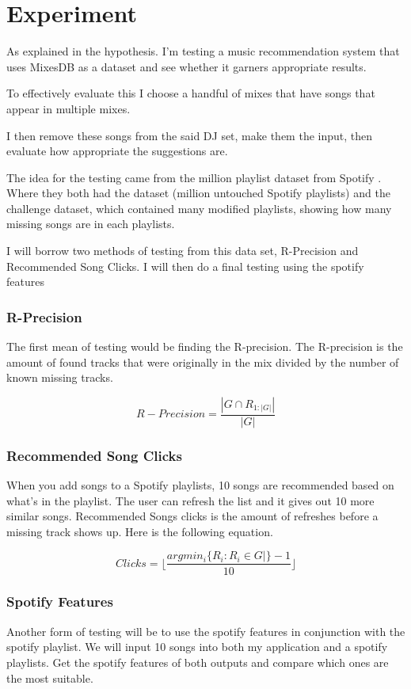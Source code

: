 
\graphicspath{{Chapter5/}}

\chapter{Experiment}

As explained in the hypothesis. I'm testing a music recommendation system that uses MixesDB as a dataset and see whether it garners appropriate results.

To effectively evaluate this I choose a handful of mixes that have songs that appear in multiple mixes.

I then remove these songs from the said DJ set, make them the input, then evaluate how appropriate the suggestions are.

The idea for the testing came from the million playlist dataset from Spotify \citep{aicrowd_aicrowd_2023}.  Where they both had the dataset (million untouched Spotify playlists) and the challenge dataset, which contained many modified playlists, showing how many missing songs are in each playlists.

I will borrow two methods of testing from this data set, R-Precision and Recommended Song Clicks. I will then do a final testing using the spotify features

\subsection{R-Precision}
The first mean of testing would be finding the R-precision. The R-precision is the amount of found tracks that were originally in the mix divided by the number of known missing tracks.

\begin{equation}
	R-Precision = \frac{|G\cap R_{1:|G|}|}{|G|}
\end{equation}


\subsection{Recommended Song Clicks}
When you add songs to a Spotify playlists, 10 songs are recommended based on what's in the playlist. The user can refresh the list and it gives out 10 more similar songs. Recommended Songs clicks is the amount of refreshes before a missing track shows up. Here is the following equation.

\begin{equation}
	Clicks= \lfloor \frac {argmin_{i}  \{ R_{i} : R_{i} \in G | \} -1} { 10 } \rfloor
\end{equation}


\subsection{Spotify Features}
Another form of testing will be to use the spotify features in conjunction with the spotify playlist. We will input 10 songs into both my application and a spotify playlists. Get the spotify features of both outputs and compare which ones are the most suitable.
